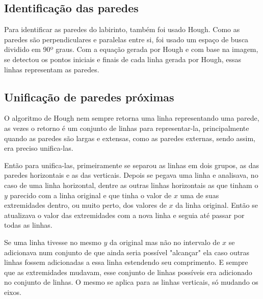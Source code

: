\documentclass[conference]{IEEEtran}
\begin{document}
\subsection{Identificação das paredes}
Para identificar as paredes do labirinto, também foi usado Hough. Como as paredes são perpendiculares e paralelas entre si, foi usado um espaço de busca dividido em 90º graus. Com a equação gerada por Hough e com base na imagem, se detectou os pontos iniciais e finais de cada linha gerada por Hough, essas linhas representam as paredes.
\subsection{Unificação de paredes próximas}
O algoritmo de Hough nem sempre retorna uma linha representando uma parede, as vezes o retorno é um conjunto de linhas para representar-la, principalmente quando as paredes são largas e extensas, como as paredes externas, sendo assim, era preciso unifica-las.

Então para unifica-las, primeiramente se separou as linhas em dois grupos, as das paredes horizontais e as das verticais. Depois se pegava uma linha e analisava, no caso de uma linha horizontal, dentre as outras linhas horizontais as que tinham o \(y\) parecido com a linha original e que tinha o valor de \(x\) uma de suas extremidades dentro, ou muito perto, dos valores de \(x\) da linha original. Então se atualizava o valor das extremidades com a nova linha e seguia até passar por todas as linhas.

Se uma linha tivesse no mesmo \(y\) da original mas não no intervalo de \(x\) se adicionava num conjunto de que ainda seria possível "alcançar" ela caso outras linhas fossem adicionadas a essa linha estendendo seu comprimento. E sempre que as extremidades mudavam, esse conjunto de linhas possíveis era adicionado no conjunto de linhas. O mesmo se aplica para as linhas verticais, só mudando os eixos.
\end{document}
